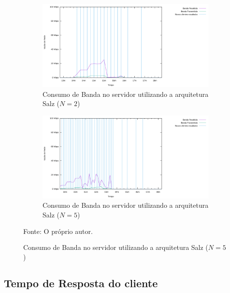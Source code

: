 \begin{figure}[htb!]
  \caption{Consumo de Banda no servidor utilizando a arquitetura Salz ($N=2$ e $N=5$)}
  \centering
  \begin{subfigure}{1.0\textwidth}
    \centering
    \includegraphics[width=.9\textwidth]{metricas_salz_t3/io.png}
    \caption{Consumo de Banda no servidor utilizando a arquitetura Salz ($N=2$)}
    \label{fig:rudy_t5_io}
  \end{subfigure}


  \begin{subfigure}{1.0\textwidth}
    \centering
    \includegraphics[width=.9\textwidth]{metricas_salz_t2/io.png}
    \caption{Consumo de Banda no servidor utilizando a arquitetura Salz ($N=5$)}
    \label{fig:rudy_t6_io}
  \end{subfigure}
  \label{fig:rudy_t56_io}

  Fonte: O próprio autor.
\end{figure}


\subsection{Tempo de Resposta do cliente}

